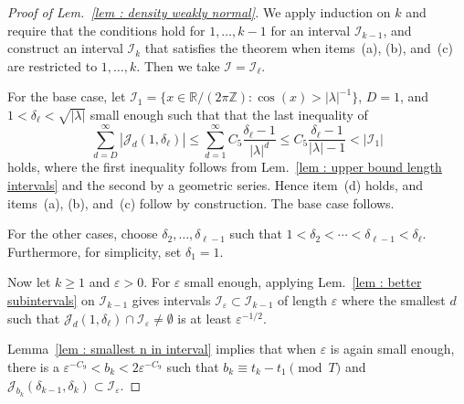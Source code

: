 \documentclass[a4paper,UKenglish,cleveref, autoref, thm-restate]{lipics-v2021}
\begin{document}
\begin{proof}[Proof of Lem.~\ref{lem : density weakly normal}]
    We apply induction on $k$ and require that the conditions hold for $1,\dots,k-1$ for an interval $\mathcal{I}_{k-1}$, and construct an interval $\mathcal{I}_k$ that satisfies the theorem when items~(a), (b), and~(c) are restricted to $1,\dots,k$. 
    Then we take $\mathcal{I} = \mathcal{I}_\ell$.

    For the base case, let $\mathcal{I}_1 = \{x \in \mathbb{R}/(2\pi\mathbb{Z}) \colon \cos(x) > |\lambda|^{-1}\}$, $D = 1$, and $1 < \delta_\ell < \sqrt{|\lambda|}$ small enough such that that the last inequality of  
    \begin{equation*}
        \sum_{d = D}^\infty |\mathcal{J}_d(1, \delta_\ell)| \le
        \sum_{d=1}^\infty C_5 \frac{\delta_\ell-1}{|\lambda|^d} \le
        C_5 \frac{\delta_\ell-1}{|\lambda|-1}  < |\mathcal{I}_1| 
    \end{equation*}
    holds, where the first inequality follows from Lem.~\ref{lem : upper bound length intervals} and the second by a geometric series.
    Hence item~(d) holds, and items~(a), (b), and~(c) follow by construction.
    The base case follows.

    For the other cases, choose $\delta_2,\dots,\delta_{\ell-1}$ such that $1 < \delta_2 < \cdots < \delta_{\ell-1} < \delta_\ell$. Furthermore, for simplicity, set $\delta_1 = 1$.
    
    Now let $k \ge 1$ and $\varepsilon > 0$.
    For $\varepsilon$ small enough, applying Lem.~\ref{lem : better subintervals} on $\mathcal{I}_{k-1}$ gives intervals $\mathcal{I}_\varepsilon \subset \mathcal{I}_{k-1}$ of length $\varepsilon$ where the smallest $d$ such that $\mathcal{J}_d(1,\delta_\ell)\cap\mathcal{I}_\varepsilon \ne \emptyset$ is at least $\varepsilon^{-1/2}$.
    
    Lemma~\ref{lem : smallest n in interval} implies that when $\varepsilon$ is again small enough, there is a $\varepsilon^{-C_9} < b_k < 2\varepsilon^{-C_9}$ such that $b_k \equiv t_k - t_1 \pmod T$ and $\mathcal{J}_{b_k}(\delta_{k-1},\delta_k) \subset \mathcal{I}_\varepsilon$. 


\end{proof}
\end{document}
